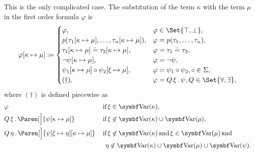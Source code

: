 \begin{definition}
\begin{DefEnum}
     This is the only complicated case. The substitution of the term \( \kappa \) with the term \( \mu \) in the first order formula \( \varphi \) is
    \begin{equation}\label{eq:def:first_order_substitution/term_in_formula}
      \varphi[\kappa \mapsto \mu] \coloneqq \begin{cases}
        \varphi,                                                           &\varphi \in \Set{ \top, \bot }, \\
        p(\tau_1[\kappa \mapsto \mu], \ldots, \tau_n[\kappa \mapsto \mu]), &\varphi = p(\tau_1, \ldots, \tau_n), \\
        \tau_1[\kappa \mapsto \mu] \doteq \tau_2[\kappa \mapsto \mu],      &\varphi = \tau_1 \doteq \tau_2, \\
        \neg \psi[\kappa \mapsto \mu],                                     &\varphi = \neg \psi, \\
        \psi_1[\kappa \mapsto \mu] \circ \psi_2[\xi \mapsto \mu],          &\varphi = \psi_1 \circ \psi_2, \circ \in \Sigma, \\
        (\dagger),                                                         &\varphi = \Qnt{Q}{\xi} \psi, Q \in \Set{ \forall, \exists },
      \end{cases}
    \end{equation}
    where \( (\dagger) \) is defined piecewise as
    \begin{align}
      &\varphi                                                                    &&\T{if} \xi \in \Bold{Var}(\kappa), \label{eq:def:first_order_substitution/term_in_formula/quantifiers/trivial} \\
      &\Qnt{Q}{\xi} \Paren[\Big]{\psi[\kappa \mapsto \mu]}                    &&\T{if} \xi \not\in \Bold{Var}(\kappa) \cup \Bold{Var}(\mu), \label{eq:def:first_order_substitution/term_in_formula/quantifiers/direct} \\
      &\Qnt{Q}{\eta} \Paren[\Big]{\psi[\xi \mapsto \eta][\kappa \mapsto \mu]} &&\T{if} \xi \not\in \Bold{Var}(\kappa) \T{and} \xi \in \Bold{Var}(\mu) \T{and} \label{eq:def:first_order_substitution/term_in_formula/quantifiers/renaming} \\
                                                                                  &&&\phantom{\T{if}} \eta \not\in \Bold{Var}(\kappa) \cup \Bold{Var}(\mu) \cup \Bold{Var}(\psi). \nonumber
    \end{align}


\end{DefEnum}
\end{definition}
